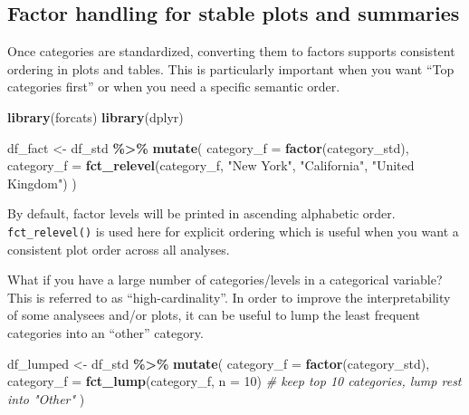 \documentclass[
  11pt,
]{article}
\newenvironment{Shaded}{\begin{snugshade}}{\end{snugshade}}
\newcommand{\AttributeTok}[1]{\textcolor[rgb]{0.13,0.29,0.53}{#1}}
\newcommand{\CommentTok}[1]{\textcolor[rgb]{0.56,0.35,0.01}{\textit{#1}}}
\newcommand{\DecValTok}[1]{\textcolor[rgb]{0.00,0.00,0.81}{#1}}
\newcommand{\FunctionTok}[1]{\textcolor[rgb]{0.13,0.29,0.53}{\textbf{#1}}}
\newcommand{\NormalTok}[1]{#1}
\newcommand{\OtherTok}[1]{\textcolor[rgb]{0.56,0.35,0.01}{#1}}
\newcommand{\SpecialCharTok}[1]{\textcolor[rgb]{0.81,0.36,0.00}{\textbf{#1}}}
\newcommand{\StringTok}[1]{\textcolor[rgb]{0.31,0.60,0.02}{#1}}
\begin{document}
\subsection{Factor handling for stable plots and
summaries}\label{factor-handling-for-stable-plots-and-summaries}

Once categories are standardized, converting them to factors supports
consistent ordering in plots and tables. This is particularly important
when you want ``Top categories first'' or when you need a specific
semantic order.

\begin{Shaded}
\begin{Highlighting}[]
\FunctionTok{library}\NormalTok{(forcats)}
\FunctionTok{library}\NormalTok{(dplyr)}

\NormalTok{df\_fact }\OtherTok{\textless{}{-}}\NormalTok{ df\_std }\SpecialCharTok{\%\textgreater{}\%}
  \FunctionTok{mutate}\NormalTok{(}
    \AttributeTok{category\_f =} \FunctionTok{factor}\NormalTok{(category\_std),}
    \AttributeTok{category\_f =} \FunctionTok{fct\_relevel}\NormalTok{(category\_f, }\StringTok{"New York"}\NormalTok{, }\StringTok{"California"}\NormalTok{, }\StringTok{"United Kingdom"}\NormalTok{)}
\NormalTok{  )}
\end{Highlighting}
\end{Shaded}

By default, factor levels will be printed in ascending alphabetic order.
\texttt{fct\_relevel()} is used here for explicit ordering which is
useful when you want a consistent plot order across all analyses.

What if you have a large number of categories/levels in a categorical
variable? This is referred to as ``high-cardinality''. In order to
improve the interpretability of some analysees and/or plots, it can be
useful to lump the least frequent categories into an ``other'' category.

\begin{Shaded}
\begin{Highlighting}[]
\NormalTok{df\_lumped }\OtherTok{\textless{}{-}}\NormalTok{ df\_std }\SpecialCharTok{\%\textgreater{}\%}
  \FunctionTok{mutate}\NormalTok{(}
    \AttributeTok{category\_f =} \FunctionTok{factor}\NormalTok{(category\_std),}
    \AttributeTok{category\_f =} \FunctionTok{fct\_lump}\NormalTok{(category\_f, }\AttributeTok{n =} \DecValTok{10}\NormalTok{)  }\CommentTok{\# keep top 10 categories, lump rest into "Other"}
\NormalTok{  )}
\end{Highlighting}
\end{Shaded}
\end{document}
